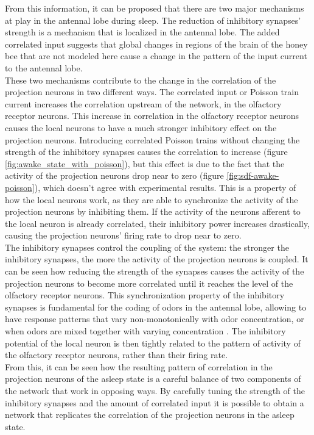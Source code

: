From this information, it can be proposed that there are two major mechanisms at play in the antennal lobe during sleep.
The reduction of inhibitory synapses' strength is a mechanism that is localized in the antennal lobe.
The added correlated input suggests that global changes in regions of the brain of the honey bee that are not modeled here cause a change in the pattern of the input current to the antennal lobe.\\
These two mechanisms contribute to the change in the correlation of the projection neurons in two different ways.
The correlated input or Poisson train current increases the correlation upstream of the network, in the olfactory receptor neurons.
This increase in correlation in the olfactory receptor neurons causes the local neurons to have a much stronger inhibitory effect on the projection neurons.
Introducing correlated Poisson trains without changing the strength of the inhibitory synapses causes the correlation to increase (figure \ref{fig:awake_state_with_poisson}), but this effect is due to the fact that the activity of the projection neurons drop near to zero (figure \ref{fig:sdf-awake-poisson}), which doesn't agree with experimental results.
This is a property of how the local neurons work, as they are able to synchronize the activity of the projection neurons by inhibiting them.
If the activity of the neurons afferent to the local neuron is already correlated, their inhibitory power increases drastically, causing the projection neurons' firing rate to drop near to zero.\\
The inhibitory synapses control the coupling of the system: the stronger the inhibitory synapses, the more the activity of the projection neurons is coupled.
It can be seen how reducing the strength of the synapses causes the activity of the projection neurons to become more correlated until it reaches the level of the olfactory receptor neurons.
This synchronization property of the inhibitory synapses is fundamental for the coding of odors in the antennal lobe, allowing to have response patterns that vary non-monotonically with odor concentration, or when odors are mixed together with varying concentration \cite{bee-geosmin}.
The inhibitory potential of the local neuron is then tightly related to the pattern of activity of the olfactory receptor neurons, rather than their firing rate.\\
From this, it can be seen how the resulting pattern of correlation in the projection neurons of the asleep state is a careful balance of two components of the network that work in opposing ways.
By carefully tuning the strength of the inhibitory synapses and the amount of correlated input it is possible to obtain a network that replicates the correlation of the projection neurons in the asleep state.


